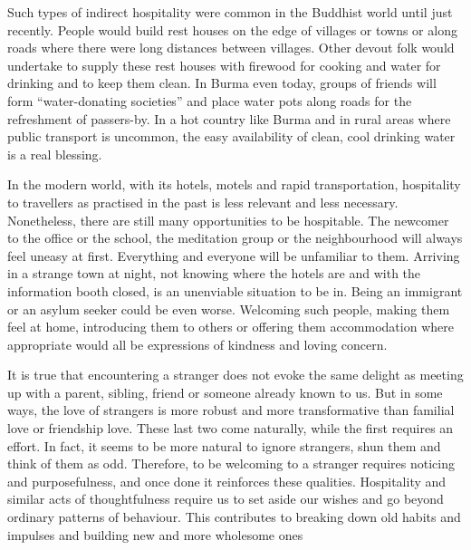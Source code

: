 \documentclass[10pt, openright]{book}
\begin{document}
Such types of indirect hospitality were common in the Buddhist world until just recently. People would build rest houses on the edge of villages or towns or along roads where there were long distances between villages. Other devout folk would undertake to supply these rest houses with firewood for cooking and water for drinking and to keep them clean. In Burma even today, groups of friends will form “water-donating societies” and place water pots along roads for the refreshment of passers-by. In a hot country like Burma and in rural areas where public transport is uncommon, the easy availability of clean, cool drinking water is a real blessing.


In the modern world, with its hotels, motels and rapid transportation, hospitality to travellers as practised in the past is less relevant and less necessary. Nonetheless, there are still many opportunities to be hospitable. The newcomer to the office or the school, the meditation group or the neighbourhood will always feel uneasy at first. Everything and everyone will be unfamiliar to them. Arriving in a strange town at night, not knowing where the hotels are and with the information booth closed, is an unenviable situation to be in. Being an immigrant or an asylum seeker could be even worse. Welcoming such people, making them feel at home, introducing them to others or offering them accommodation where appropriate would all be expressions of kindness and loving concern.


It is true that encountering a stranger does not evoke the same delight as meeting up with a parent, sibling, friend or someone already known to us. But in some ways, the love of strangers is more robust and more transformative than familial love or friendship love. These last two come naturally, while the first requires an effort. In fact, it seems to be more natural to ignore strangers, shun them and think of them as odd. Therefore, to be welcoming to a stranger requires noticing and purposefulness, and once done it reinforces these qualities. Hospitality and similar acts of thoughtfulness require us to set aside our wishes and go beyond ordinary patterns of behaviour. This contributes to breaking down old habits and impulses and building new and more wholesome ones
\end{document}
